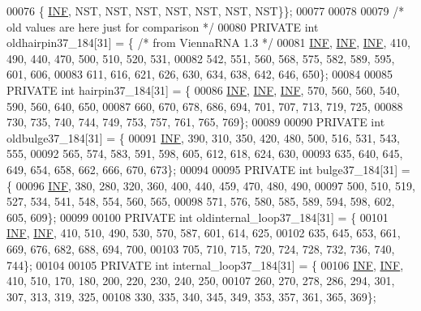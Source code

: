 \begin{DoxyCode}
00076   \{  \hyperlink{energy__const_8h_a12c2040f25d8e3a7b9e1c2024c618cb6}{INF},   NST,   NST,   NST,   NST,   NST,   NST, NST\}\};
00077 
00078 
00079 \textcolor{comment}{/* old values are here just for comparison */}
00080 PRIVATE \textcolor{keywordtype}{int} oldhairpin37\_184[31] = \{ \textcolor{comment}{/* from ViennaRNA 1.3 */}
00081   \hyperlink{energy__const_8h_a12c2040f25d8e3a7b9e1c2024c618cb6}{INF}, \hyperlink{energy__const_8h_a12c2040f25d8e3a7b9e1c2024c618cb6}{INF}, \hyperlink{energy__const_8h_a12c2040f25d8e3a7b9e1c2024c618cb6}{INF}, 410, 490, 440, 470, 500, 510, 520, 531,
00082        542, 551, 560, 568, 575, 582, 589, 595, 601, 606,
00083        611, 616, 621, 626, 630, 634, 638, 642, 646, 650\};
00084 
00085 PRIVATE \textcolor{keywordtype}{int} hairpin37\_184[31] = \{
00086   \hyperlink{energy__const_8h_a12c2040f25d8e3a7b9e1c2024c618cb6}{INF}, \hyperlink{energy__const_8h_a12c2040f25d8e3a7b9e1c2024c618cb6}{INF}, \hyperlink{energy__const_8h_a12c2040f25d8e3a7b9e1c2024c618cb6}{INF}, 570, 560, 560, 540, 590, 560, 640, 650,
00087        660, 670, 678, 686, 694, 701, 707, 713, 719, 725,
00088        730, 735, 740, 744, 749, 753, 757, 761, 765, 769\};
00089 
00090 PRIVATE \textcolor{keywordtype}{int} oldbulge37\_184[31] = \{
00091   \hyperlink{energy__const_8h_a12c2040f25d8e3a7b9e1c2024c618cb6}{INF}, 390, 310, 350, 420, 480, 500, 516, 531, 543, 555,
00092        565, 574, 583, 591, 598, 605, 612, 618, 624, 630,
00093        635, 640, 645, 649, 654, 658, 662, 666, 670, 673\};
00094 
00095 PRIVATE \textcolor{keywordtype}{int} bulge37\_184[31] = \{
00096   \hyperlink{energy__const_8h_a12c2040f25d8e3a7b9e1c2024c618cb6}{INF}, 380, 280, 320, 360, 400, 440, 459, 470, 480, 490,
00097        500, 510, 519, 527, 534, 541, 548, 554, 560, 565,
00098   571, 576, 580, 585, 589, 594, 598, 602, 605, 609\};
00099 
00100 PRIVATE \textcolor{keywordtype}{int} oldinternal\_loop37\_184[31] = \{
00101   \hyperlink{energy__const_8h_a12c2040f25d8e3a7b9e1c2024c618cb6}{INF}, \hyperlink{energy__const_8h_a12c2040f25d8e3a7b9e1c2024c618cb6}{INF}, 410, 510, 490, 530, 570, 587, 601, 614, 625,
00102        635, 645, 653, 661, 669, 676, 682, 688, 694, 700,
00103        705, 710, 715, 720, 724, 728, 732, 736, 740, 744\};
00104 
00105 PRIVATE \textcolor{keywordtype}{int} internal\_loop37\_184[31] = \{
00106   \hyperlink{energy__const_8h_a12c2040f25d8e3a7b9e1c2024c618cb6}{INF}, \hyperlink{energy__const_8h_a12c2040f25d8e3a7b9e1c2024c618cb6}{INF}, 410, 510, 170, 180, 200, 220, 230, 240, 250,
00107        260, 270, 278, 286, 294, 301, 307, 313, 319, 325,
00108        330, 335, 340, 345, 349, 353, 357, 361, 365, 369\};

\end{DoxyCode}
